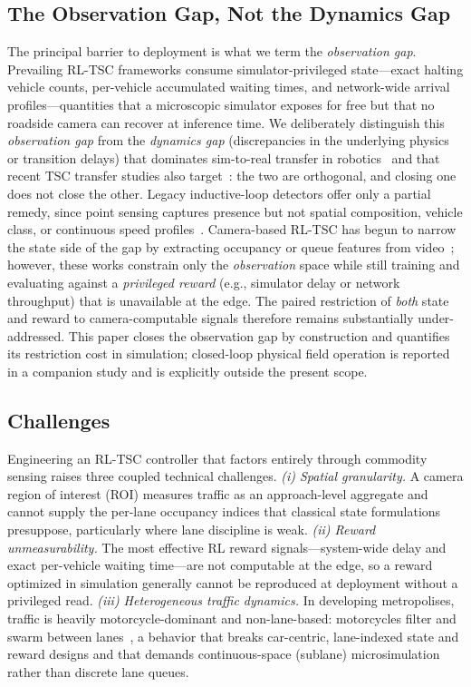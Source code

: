 \subsection{The Observation Gap, Not the Dynamics Gap}
The principal barrier to deployment is what we term the \emph{observation gap}.
Prevailing RL-TSC frameworks consume simulator-privileged state---exact halting vehicle counts, per-vehicle accumulated waiting times, and network-wide arrival profiles---quantities that a microscopic simulator exposes for free but that no roadside camera can recover at inference time. We deliberately distinguish this
\emph{observation gap} from the \emph{dynamics gap} (discrepancies in the underlying physics or transition delays) that dominates sim-to-real transfer in robotics~\cite{peng2018_dynrand,zhao2020_sim2real_survey} and that recent TSC transfer studies also target~\cite{da2024_promptgat}: the two are orthogonal, and closing one does not close the other. Legacy inductive-loop detectors offer only a partial remedy, since point sensing captures presence but not spatial composition, vehicle class, or continuous speed profiles~\cite{zhang2021_partialdetection}. Camera-based RL-TSC has begun to narrow the state side of the gap by extracting occupancy or queue features from
video~\cite{dai2022_worldmodels,azfar2025_cosim,su2025_visionllm}; however, these works constrain only the \emph{observation} space while still training and evaluating against a \emph{privileged reward} (e.g., simulator delay or network throughput) that is unavailable at the edge. The paired restriction of
\emph{both} state and reward to camera-computable signals therefore remains substantially under-addressed. This paper closes the observation gap by construction and quantifies its restriction cost in simulation; closed-loop physical field operation is reported in a companion study and is explicitly outside the present scope.

\subsection{Challenges}
Engineering an RL-TSC controller that factors entirely through commodity sensing raises three coupled technical challenges.
\emph{(i) Spatial granularity.} A camera region of interest (ROI) measures traffic as an approach-level aggregate and cannot supply the per-lane occupancy indices that classical state formulations presuppose, particularly where lane discipline is weak.
\emph{(ii) Reward unmeasurability.} The most effective RL reward signals---system-wide delay and exact per-vehicle waiting time---are not computable at the edge, so a reward optimized in simulation generally cannot be reproduced at deployment without a privileged read.
\emph{(iii) Heterogeneous traffic dynamics.} In developing metropolises, traffic is heavily motorcycle-dominant and non-lane-based: motorcycles filter and swarm between lanes~\cite{ngoc2021_fivecities,vn_roundabout}, a behavior that 
breaks car-centric, lane-indexed state and reward designs and that demands continuous-space (sublane) microsimulation rather than discrete lane queues.

